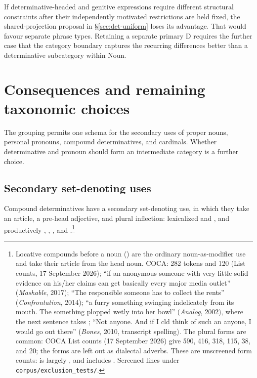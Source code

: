 \documentclass[12pt]{article}
\begin{document}
If determinative-headed and genitive expressions require different structural constraints after their independently motivated restrictions are held fixed, the shared-projection proposal in §\ref{sec:det-uniform} loses its advantage. That would favour separate phrase types. Retaining a separate primary D requires the further case that the category boundary captures the recurring differences better than a determinative subcategory within Noun.

\section{Consequences and remaining taxonomic choices}\label{sec:consequences}

The grouping permits one schema for the secondary uses of proper nouns, personal pronouns, compound determinatives, and cardinals. Whether determinative and pronoun should form an intermediate category is a further choice.

\subsection{Secondary set-denoting uses}\label{sec:secondary-use}

Compound determinatives have a secondary set-denoting use, in which they take an article, a pre-head adjective, and plural inflection: lexicalized  and , and productively , , , and .\footnote{Locative compounds before a noun () are the ordinary noun-as-modifier use and take their article from the head noun. COCA:  282 tokens and  120 (List counts, 17 September 2026); \enquote{if an anonymous someone with very little solid evidence on his/her claims can get basically every major media outlet} (\textit{Mashable}, 2017); \enquote{The responsible someone has to collect the rents} (\textit{Confrontation}, 2014); \enquote{a furry something swinging indelicately from its mouth. The something plopped wetly into her bowl} (\textit{Analog}, 2002), where the next sentence takes ; \enquote{Not anyone. And if I cld think of such an anyone, I would go out there} (\textit{Bones}, 2010, transcript spelling). The plural forms are common: COCA List counts (17 September 2026) give  590,  416,  318,  115,  38, and  20; the  forms are left out as dialectal adverbs. These are unscreened form counts:  is largely , and  includes . Screened lines under \texttt{corpus/exclusion\_tests/}.}
\end{document}

